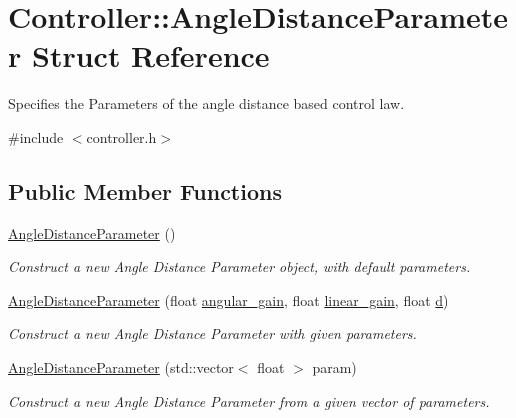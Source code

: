\hypertarget{structController_1_1AngleDistanceParameter}{}\section{Controller\+:\+:Angle\+Distance\+Parameter Struct Reference}
\label{structController_1_1AngleDistanceParameter}


Specifies the Parameters of the angle distance based control law.  




{\ttfamily \#include $<$controller.\+h$>$}

\subsection*{Public Member Functions}
\begin{DoxyCompactItemize}
\item 
\hyperlink{structController_1_1AngleDistanceParameter_a13a71741708edb6c837fe7ff40840dde}{Angle\+Distance\+Parameter} ()\hypertarget{structController_1_1AngleDistanceParameter_a13a71741708edb6c837fe7ff40840dde}{}\label{structController_1_1AngleDistanceParameter_a13a71741708edb6c837fe7ff40840dde}

\begin{DoxyCompactList}\small\item\em Construct a new Angle Distance Parameter object, with default parameters. \end{DoxyCompactList}\item 
\hyperlink{structController_1_1AngleDistanceParameter_a07d302639f766797f8dd427935c882c2}{Angle\+Distance\+Parameter} (float \hyperlink{structController_1_1AngleDistanceParameter_ac2bab50d5c5f357d05632e3abc463dbf}{angular\+\_\+gain}, float \hyperlink{structController_1_1AngleDistanceParameter_a519dfcbf82e3e44a9a315b91964fa7de}{linear\+\_\+gain}, float \hyperlink{structController_1_1AngleDistanceParameter_a360e632b14647dce7dbadf168901880c}{d})
\begin{DoxyCompactList}\small\item\em Construct a new Angle Distance Parameter with given parameters. \end{DoxyCompactList}\item 
\hyperlink{structController_1_1AngleDistanceParameter_ab77c9431c35886760e7a2fb659008ab2}{Angle\+Distance\+Parameter} (std\+::vector$<$ float $>$ param)
\begin{DoxyCompactList}\small\item\em Construct a new Angle Distance Parameter from a given vector of parameters. \end{DoxyCompactList}\end{DoxyCompactItemize}

